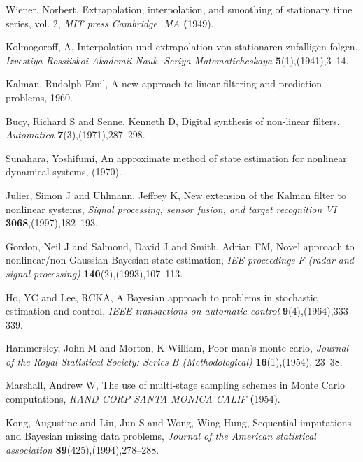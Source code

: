 \documentclass[mstat,12pt]{unswthesis}  %
\numberwithin{equation}{section}
\begin{document}
\begin{thebibliography}{999}
Wiener, Norbert, Extrapolation, interpolation, and smoothing of stationary time series, vol. 2,
\textit {MIT press Cambridge, MA}
\textbf (1949).
 
 Kolmogoroff, A, Interpolation und extrapolation von stationaren zufalligen folgen,
\textit{Izvestiya Rossiiskoi Akademii Nauk. Seriya Matematicheskaya} 
\textbf{5}(1),(1941),3--14.




 
 Kalman, Rudolph Emil,
A new approach to linear filtering and prediction problems,
1960.

 Bucy, Richard S and Senne, Kenneth D,
Digital synthesis of non-linear filters,
\textit{Automatica}
\textbf{7}(3),(1971),287--298.

 Sunahara, Yoshifumi,
An approximate method of state estimation for nonlinear dynamical systems,
(1970).



 Julier, Simon J and Uhlmann, Jeffrey K,
New extension of the Kalman filter to nonlinear systems,
\textit{Signal processing, sensor fusion, and target recognition VI}
\textbf{3068},(1997),182--193.


 Gordon, Neil J and Salmond, David J and Smith, Adrian FM,
Novel approach to nonlinear/non-Gaussian Bayesian state estimation,
\textit{IEE proceedings F (radar and signal processing)}
\textbf{140}(2),(1993),107--113.



 Ho, YC and Lee, RCKA,
A Bayesian approach to problems in stochastic estimation and control,
\textit{IEEE transactions on automatic control}
\textbf{9}(4),(1964),333--339.

Hammersley, John M and Morton, K William,
Poor man's monte carlo,
\textit{Journal of the Royal Statistical Society: Series B (Methodological)}
\textbf{16}(1),(1954), 23--38.



Marshall, Andrew W,
The use of multi-stage sampling schemes in Monte Carlo computations,
\textit{RAND CORP SANTA MONICA CALIF}
\textbf(1954).

 Kong, Augustine and Liu, Jun S and Wong, Wing Hung,
Sequential imputations and Bayesian missing data problems,
\textit{Journal of the American statistical association}
\textbf{89}(425),(1994),278--288.


\end{thebibliography}
\end{document}

